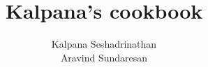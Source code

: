\documentclass[multi]{EngC} %
\begin{document}
\title[A collection of vegetarian recipes]
{Kalpana's cookbook}

\author{Kalpana Seshadrinathan \\ Aravind Sundaresan}

\frontmatter
\maketitle
\tableofcontents
\listoffigures
%

\mainmatter



\backmatter
%

\theendnotes


\cleardoublepage


\printindex


\end{document}
